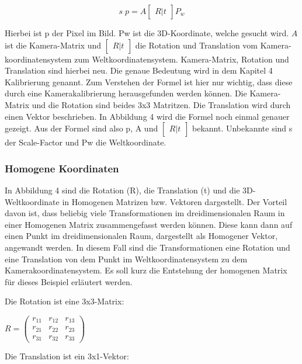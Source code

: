 	\begin{equation}
		s \; p = A \begin{bmatrix} R|t \end{bmatrix} P_w
		\label{eq:transforamtion}
	\end{equation}
	
	Hierbei ist p der Pixel im Bild. Pw ist die 3D-Koordinate, welche gesucht wird. \( A \) ist die Kamera-Matrix und \( \begin{bmatrix} R|t \end{bmatrix} \) die Rotation und Translation vom Kamera-koordinatensystem zum Weltkoordinatensystem. Kamera-Matrix, Rotation und Translation sind hierbei neu. Die genaue Bedeutung wird in dem Kapitel 4 Kalibrierung genannt. Zum Verstehen der Formel ist hier nur wichtig, dass diese durch eine Kamerakalibrierung herausgefunden werden können. Die Kamera-Matrix und die Rotation sind beides 3x3 Matritzen. Die Translation wird durch einen Vektor beschrieben. In Abbildung 4 wird die Formel noch einmal genauer gezeigt. Aus der Formel sind also p, A und \( \begin{bmatrix} R|t \end{bmatrix} \) bekannt. Unbekannte sind s der Scale-Factor und Pw die Weltkoordinate.
	
		\subsubsection{Homogene Koordinaten}
		In Abbildung 4 sind die Rotation (R), die Translation (t) und die 3D-Weltkoordinate in Homogenen Matrizen bzw. Vektoren dargestellt. Der Vorteil davon ist, dass beliebig viele Transformationen im dreidimensionalen Raum in einer Homogenen Matrix zusammengefasst werden können. Diese kann dann auf einen Punkt im dreidimensionalen Raum, dargestellt als Homogener Vektor, angewandt werden. In diesem Fall sind die Transformationen eine Rotation und eine Translation von dem Punkt im Weltkoordinatensystem zu dem Kamerakoordinatensystem. Es soll kurz die Entstehung der homogenen Matrix für dieses Beispiel erläutert werden.
		
		Die Rotation ist eine 3x3-Matrix:
		
		\( R = \begin{pmatrix} 
		r_{11} & r_{12} & r_{13} \\ r_{21} & r_{22} & r_{23} \\ r_{31} & r_{32} & r_{33} \end{pmatrix} \)
		
		Die Translation ist ein 3x1-Vektor:
		
